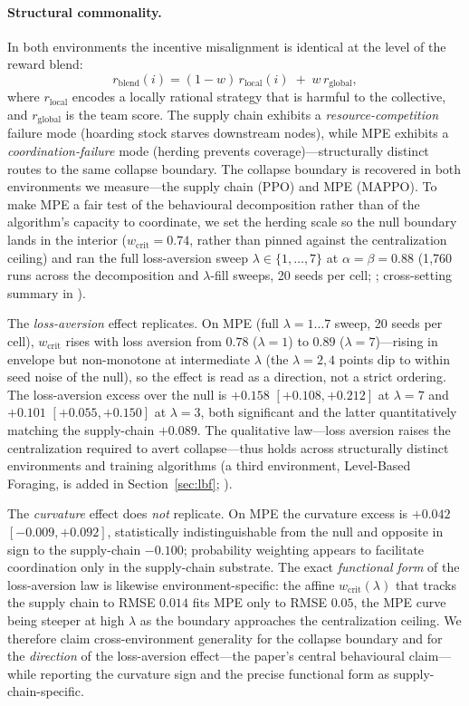 \documentclass[letterpaper]{article}
\theoremstyle{plain}
\newcommand{\wcrit}{w_{\mathrm{crit}}}
\begin{document}
\paragraph{Structural commonality.}
In both environments the incentive misalignment is identical at the level of the
reward blend:
\begin{equation}
  r_{\text{blend}}(i) = (1-w)\,r_{\text{local}}(i) \;+\; w\,r_{\text{global}},
\end{equation}
where $r_{\text{local}}$ encodes a locally rational strategy that is harmful to
the collective, and $r_{\text{global}}$ is the team score. The supply chain
exhibits a \emph{resource-competition} failure mode (hoarding stock starves
downstream nodes), while MPE exhibits a \emph{coordination-failure} mode (herding
prevents coverage)---structurally distinct routes to the same collapse boundary.
The collapse boundary is recovered in both environments we measure---the supply
chain (PPO) and MPE (MAPPO). To make MPE a fair test of the behavioural
decomposition rather than of the algorithm's capacity to coordinate, we set the
herding scale so the null boundary lands in the interior ($\wcrit{=}0.74$, rather
than pinned against the centralization ceiling) and ran the full loss-aversion
sweep $\lambda\in\{1,\ldots,7\}$ at $\alpha{=}\beta{=}0.88$ (1{,}760 runs across
the decomposition and $\lambda$-fill sweeps, 20 seeds per cell;
; cross-setting summary in ).

The \emph{loss-aversion} effect replicates. On MPE (full $\lambda{=}1{\ldots}7$
sweep, 20 seeds per cell), $\wcrit$ rises with loss aversion from $0.78$
($\lambda{=}1$) to $0.89$ ($\lambda{=}7$)---rising in envelope but non-monotone at
intermediate $\lambda$ (the $\lambda{=}2,4$ points dip to within seed noise of the
null), so the effect is read as a direction, not a strict ordering. The
loss-aversion excess over the null is $+0.158$ $[+0.108, +0.212]$ at
$\lambda{=}7$ and $+0.101$ $[+0.055, +0.150]$ at $\lambda{=}3$, both significant
and the latter quantitatively matching the supply-chain $+0.089$. The
qualitative law---loss aversion raises the centralization required to avert
collapse---thus holds across structurally distinct environments and training
algorithms (a third environment, Level-Based Foraging, is added in
Section~\ref{sec:lbf}; ).

The \emph{curvature} effect does \emph{not} replicate. On MPE the curvature
excess is $+0.042$ $[-0.009, +0.092]$, statistically indistinguishable from the
null and opposite in sign to the supply-chain $-0.100$; probability weighting
appears to facilitate coordination only in the supply-chain substrate. The exact
\emph{functional form} of the loss-aversion law is likewise environment-specific:
the affine $\wcrit(\lambda)$ that tracks the supply chain to RMSE $0.014$ fits MPE
only to RMSE $0.05$, the MPE curve being steeper at high $\lambda$ as the boundary
approaches the centralization ceiling. We therefore claim cross-environment
generality for the collapse boundary and for the \emph{direction} of the
loss-aversion effect---the paper's central behavioural claim---while reporting the
curvature sign and the precise functional form as supply-chain-specific.
\end{document}
